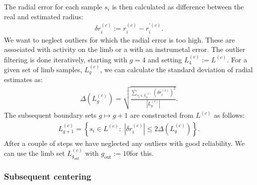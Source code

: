 \documentclass{aa}
\newcommand{\eqnl}[2]{\begin{eqnarray}\label{#1}#2\end{eqnarray}}
\newcommand{\s}[2]{{#1}_{\mathrm{#2}}}
\begin{document}
  
  The radial error for each sample $s_i$ is then calculated as difference between the real and estimated radius:
  \eqnl{calib_deviation1}{
  \delta r_i^{(c)} := r_i^{(c)} - r_i^{\prime(c)} \text{.}
  }
   We want to neglect outliers for which the radial error is too high. These are associated with activity on the limb or 
  a with an instrumetal error. The outlier filtering is done iteratively, starting with $g=4$ and setting $L^{(c)}_4 := 
  L^{(c)}$.
  For a given set of limb samples, $L^{(c)}_g$, we can calculate the standard deviation of radial estimates as:
  \eqnl{calib_deviation2}{
  \Delta \left( L^{(c)}_g \right) = \sqrt{\frac{\sum \limits_{s_i \in L^{(c)}_g} \left( \delta r_i^{(c)} \right)^2}{\left|L^{(c)}_g \right|}} \text{.}
  }
  The subsequent boundary sets $g \mapsto g+1$ are constructed from $L^{(c)}$ as follows:
  \eqnl{calib_deviation3}{
  L^{(c)}_{g+1} = \left\{ s_i \in L^{(c)} : \; \left|\delta r_i^{(c)} \right| \le 2 \Delta \left( L^{(c)}_{g} \right) \right\} \text{.}
  }
  After a couple of steps we have neglected any outliers with good reliability. We can use the limb set $L^{(c)}_{\s{g}{out}}$ with $\s{g}{out} := 10$for this.

  \subsubsection{Subsequent centering} \label{sect:subsequent-centering}
\end{document}
